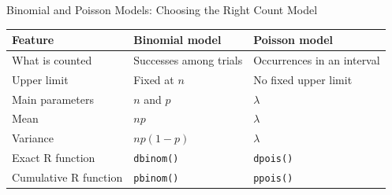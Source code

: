 \documentclass[aspectratio=169]{beamer}
\begin{document}
\begin{frame}{Binomial and Poisson Models: Choosing the Right Count Model}
\begin{table}
\centering
\small
\begin{tabularx}{\textwidth}{>{\RaggedRight\arraybackslash}p{} >{\RaggedRight\arraybackslash}p{} >{\RaggedRight\arraybackslash}X}
\toprule
Feature & Binomial model & Poisson model \\
\midrule
What is counted & Successes among trials & Occurrences in an interval \\
Upper limit & Fixed at $n$ & No fixed upper limit \\
Main parameters & $n$ and $p$ & $\lambda$ \\
Mean & $np$ & $\lambda$ \\
Variance & $np(1-p)$ & $\lambda$ \\
Exact R function & \texttt{dbinom()} & \texttt{dpois()} \\
Cumulative R function & \texttt{pbinom()} & \texttt{ppois()} \\
\bottomrule
\end{tabularx}
\end{table}
\end{frame}
\end{document}
